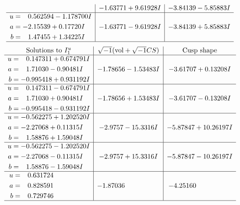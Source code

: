 \documentclass[1p]{elsarticle_modified}
\theoremstyle{definition}
\newcommand{\I}{\sqrt{-1}}
\begin{document}
$$\begin{array}{c|c|c}
 & -1.63771 + 9.61928 I & -3.84139 - 5.85883 I \\ \hline\begin{aligned}
u &= \phantom{-}0.562594 - 1.178700 I \\
a &= -2.15539 + 0.17720 I \\
b &= \phantom{-}1.47455 + 1.34225 I\end{aligned}
 & -1.63771 - 9.61928 I & -3.84139 + 5.85883 I\\
 \hline 
 \end{array}$$\newpage$$\begin{array}{c|c|c}  
\text{Solutions to }I^u_{1}& \I (\text{vol} + \sqrt{-1}CS) & \text{Cusp shape}\\
 \hline 
\begin{aligned}
u &= \phantom{-}0.147311 + 0.674791 I \\
a &= \phantom{-}1.71030 - 0.90481 I \\
b &= -0.995418 + 0.931192 I\end{aligned}
 & -1.78656 - 1.53483 I & -3.61707 + 0.13208 I \\ \hline\begin{aligned}
u &= \phantom{-}0.147311 - 0.674791 I \\
a &= \phantom{-}1.71030 + 0.90481 I \\
b &= -0.995418 - 0.931192 I\end{aligned}
 & -1.78656 + 1.53483 I & -3.61707 - 0.13208 I \\ \hline\begin{aligned}
u &= -0.562275 + 1.202520 I \\
a &= -2.27068 + 0.11315 I \\
b &= \phantom{-}1.58876 + 1.59048 I\end{aligned}
 & -2.9757 - 15.3316 I & -5.87847 + 10.26197 I \\ \hline\begin{aligned}
u &= -0.562275 - 1.202520 I \\
a &= -2.27068 - 0.11315 I \\
b &= \phantom{-}1.58876 - 1.59048 I\end{aligned}
 & -2.9757 + 15.3316 I & -5.87847 - 10.26197 I \\ \hline\begin{aligned}
u &= \phantom{-}0.631724\phantom{ +0.000000I} \\
a &= \phantom{-}0.828591\phantom{ +0.000000I} \\
b &= \phantom{-}0.729746\phantom{ +0.000000I}\end{aligned}
 & -1.87036\phantom{ +0.000000I} & -4.25160\phantom{ +0.000000I}\\
 \hline 
 \end{array}$$\newpage\newpage\renewcommand{\arraystretch}{1}
\end{document}
